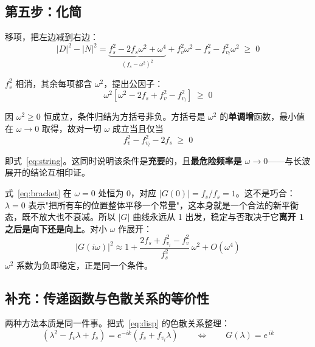 \documentclass[11pt,a4paper,openany]{book}
\numberwithin{equation}{chapter}
\numberwithin{figure}{chapter}
\numberwithin{table}{chapter}
\begin{document}
\subsection{第五步：化简}

移项，把左边减到右边：
\begin{equation}
\left|D\right|^2 - \left|N\right|^2
= \underbrace{f_s^2 - 2f_s\omega^2 + \omega^4}_{\left(f_s-\omega^2\right)^2} + f_v^2\omega^2 - f_s^2 - f_{v_l}^2\omega^2 \;\ge\; 0
\end{equation}

$f_s^2$ 相消，其余每项都含 $\omega^2$，提出公因子：
\begin{equation}
\omega^2\left[\omega^2 - 2f_s + f_v^2 - f_{v_l}^2\right] \;\ge\; 0
\label{eq:bracket}
\end{equation}

因 $\omega^2\ge0$ 恒成立，条件归结为方括号非负。方括号是 $\omega^2$ 的\textbf{单调增}函数，最小值在 $\omega\to0$ 取得，故对一切 $\omega$ 成立当且仅当
\begin{equation}
f_v^2 - f_{v_l}^2 - 2f_s \;\ge\; 0
\end{equation}

即式~\eqref{eq:string}。这同时说明该条件是\textbf{充要}的，且\textbf{最危险频率是 $\omega\to0$}——与长波展开的结论互相印证。

\begin{tcolorbox}[notebox,title=\textbf{为什么 $\omega=0$ 处总是取等号}]
式~\eqref{eq:bracket} 在 $\omega=0$ 处恒为 0，对应 $\left|G(0)\right| = f_s/f_s = 1$。这不是巧合：$\lambda=0$ 表示"把所有车的位置整体平移一个常量"，这本身就是一个合法的新平衡态，既不放大也不衰减。所以 $\left|G\right|$ 曲线永远从 1 出发，稳定与否取决于它\textbf{离开 1 之后是向下还是向上}。对小 $\omega$ 作展开：
\[
\left|G(i\omega)\right|^2 \approx 1 + \frac{2f_s + f_{v_l}^2 - f_v^2}{f_s^2}\,\omega^2 + O(\omega^4)
\]
$\omega^2$ 系数为负即稳定，正是同一个条件。
\end{tcolorbox}

\subsection{补充：传递函数与色散关系的等价性}

两种方法本质是同一件事。把式~\eqref{eq:disp} 的色散关系整理：
\begin{equation}
\left(\lambda^2 - f_v\lambda + f_s\right) = e^{-ik}\left(f_s + f_{v_l}\lambda\right)
\qquad\Longleftrightarrow\qquad
G(\lambda) = e^{\,ik}
\end{equation}
\end{document}
